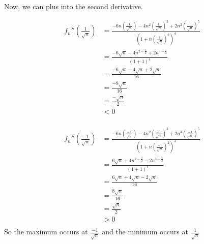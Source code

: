 \documentclass[12pt,letterpaper]{article}
\begin{document}
\begin{enumerate}
\begin{enumerate}
          Now, we can plus into the second derivative.

          \begin{align*}
            f_n''\left(\frac{1}{\sqrt{n}}\right)
            &= \frac{-6n\left(\frac{1}{\sqrt{n}}\right) - 4n^2\left(\frac{1}{\sqrt{n}}\right)^3 + 2n^3\left(\frac{1}{\sqrt{n}}\right)^5}{\left(1 + n\left(\frac{1}{\sqrt{n}}\right)^2\right)^4} \\
            &= \frac{-6\sqrt{n} - 4n^{2 - \frac{3}{2}} + 2n^{3 - \frac{5}{2}}}{\left(1 + 1\right)^4} \\
            &= \frac{-6\sqrt{n} - 4\sqrt{n} + 2\sqrt{n}}{16} \\
            &= \frac{-8\sqrt{n}}{16} \\
            &= \frac{-\sqrt{n}}{2} \\
            &< 0 \\
          \end{align*}

          \begin{align*}
            f_n''\left(\frac{-1}{\sqrt{n}}\right)
            &= \frac{-6n\left(\frac{-1}{\sqrt{n}}\right) - 4n^2\left(\frac{-1}{\sqrt{n}}\right)^3 + 2n^3\left(\frac{-1}{\sqrt{n}}\right)^5}{\left(1 + n\left(\frac{-1}{\sqrt{n}}\right)^2\right)^4} \\
            &= \frac{6\sqrt{n} + 4n^{2 - \frac{3}{2}} - 2n^{3 - \frac{5}{2}}}{\left(1 + 1\right)^4} \\
            &= \frac{6\sqrt{n} + 4\sqrt{n} - 2\sqrt{n}}{16} \\
            &= \frac{8\sqrt{n}}{16} \\
            &= \frac{\sqrt{n}}{2} \\
            &> 0 \\
          \end{align*}
          So the maximum occurs at $\frac{-1}{\sqrt{n}}$ and the minimum occurs at $\frac{1}{\sqrt{n}}$
      \end{enumerate}
  \end{enumerate}
\end{document}

